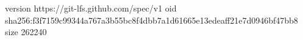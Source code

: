 version https://git-lfs.github.com/spec/v1
oid sha256:f3f7159c99344a767a3b55bc8f4dbb7a1d61665e13edeaff21e7d0946bf47bb8
size 262240
